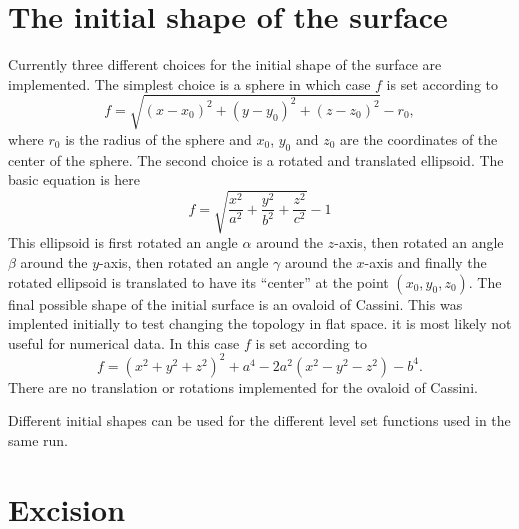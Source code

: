\section{The initial shape of the surface}
\label{AEIThorns_EHFinder_initial}
Currently three different choices for the initial shape of the surface are
implemented. The simplest choice is a sphere in which case $f$ is set
according to
\begin{equation}
f = \sqrt{(x-x_{0})^2+(y-y_{0})^2+(z-z_{0})^2} - r_{0},
\label{AEIThorns_EHFinder_sphere}
\end{equation}
where $r_{0}$ is the radius of the sphere and $x_{0}$, $y_{0}$ and $z_{0}$
are the coordinates of the center of the sphere. The second choice is a rotated
and translated ellipsoid. The basic equation is here
\begin{equation}
f = \sqrt{\frac{x^{2}}{a^{2}}+\frac{y^{2}}{b^{2}}+\frac{z^{2}}{c^{2}}} - 1
\label{AEIThorns_EHFinder_ellipsoid}
\end{equation}
This ellipsoid is first rotated an angle $\alpha$ around the $z$-axis, then
rotated an angle $\beta$ around the $y$-axis, then rotated an angle $\gamma$
around the $x$-axis and finally the rotated ellipsoid is translated to have
its ``center'' at the point $(x_{0},y_{0},z_{0})$. The final possible shape
of the initial surface is an ovaloid of Cassini. This was implented initially
to test changing the topology in flat space. it is most likely not useful for
numerical data. In this case $f$ is set according to
\begin{equation}
f = (x^{2}+y^{2}+z^{2})^{2} + a^{4} - 2 a^{2} (x^{2}-y^{2}-z^{2})-b^{4}.
\label{AEIThorns_EHFinder_cassini}
\end{equation}
There are no translation or rotations implemented for the ovaloid of Cassini.

Different initial shapes can be used for the different level set functions
used in the same run.
\section{Excision}
\label{AEIThorns_EHFinder_excise}

